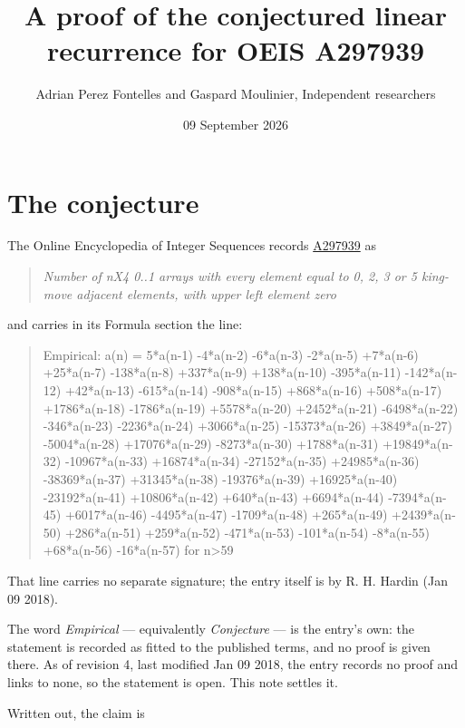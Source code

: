 \documentclass[11pt]{article}
\title{A proof of the conjectured linear recurrence for OEIS A297939}
\author{Adrian Perez Fontelles and Gaspard Moulinier, Independent researchers}
\date{09 September 2026}
\theoremstyle{definition}
\begin{document}
\maketitle
\section{The conjecture}

The Online Encyclopedia of Integer Sequences records \href{https://oeis.org/A297939}{A297939} as

\begin{quote}\itshape Number of nX4 0..1 arrays with every element equal to 0, 2, 3 or 5 king-move adjacent elements, with upper left element zero\end{quote}

and carries in its Formula section the line:

\begin{quote}\ttfamily Empirical: a(n) = 5*a(n-1) -4*a(n-2) -6*a(n-3) -2*a(n-5) +7*a(n-6) +25*a(n-7) -138*a(n-8) +337*a(n-9) +138*a(n-10) -395*a(n-11) -142*a(n-12) +42*a(n-13) -615*a(n-14) -908*a(n-15) +868*a(n-16) +508*a(n-17) +1786*a(n-18) -1786*a(n-19) +5578*a(n-20) +2452*a(n-21) -6498*a(n-22) -346*a(n-23) -2236*a(n-24) +3066*a(n-25) -15373*a(n-26) +3849*a(n-27) -5004*a(n-28) +17076*a(n-29) -8273*a(n-30) +1788*a(n-31) +19849*a(n-32) -10967*a(n-33) +16874*a(n-34) -27152*a(n-35) +24985*a(n-36) -38369*a(n-37) +31345*a(n-38) -19376*a(n-39) +16925*a(n-40) -23192*a(n-41) +10806*a(n-42) +640*a(n-43) +6694*a(n-44) -7394*a(n-45) +6017*a(n-46) -4495*a(n-47) -1709*a(n-48) +265*a(n-49) +2439*a(n-50) +286*a(n-51) +259*a(n-52) -471*a(n-53) -101*a(n-54) -8*a(n-55) +68*a(n-56) -16*a(n-57) for n>59\end{quote}

That line carries no separate signature; the entry itself is by R. H. Hardin (Jan 09 2018).

The word {\itshape Empirical} --- equivalently {\itshape Conjecture} --- is the entry's own: the statement is recorded as fitted to the published terms, and no proof is given there. As of revision 4, last modified Jan 09 2018, the entry records no proof and links to none, so the statement is open. This note settles it.

Written out, the claim is
\end{document}
